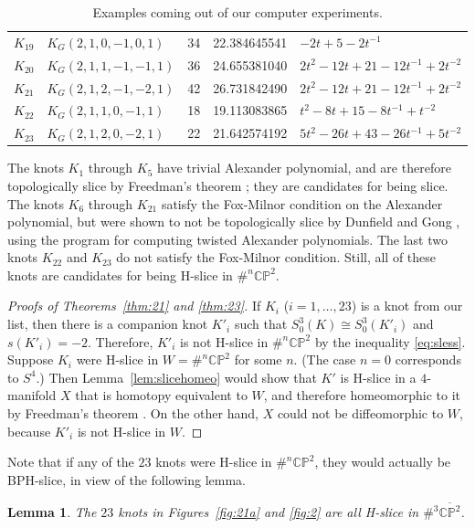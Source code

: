 \documentclass [11pt]{amsart}
\newtheorem {lemma}[theorem]{Lemma}
\theoremstyle{remark}
\def\CP{\mathbb{CP}^2}
\def\bCP{\overline{\mathbb{CP}^2}}
\begin{document}
\begin{table}
\begin{center}
\begin{tabular}{|c| l |  c | c | l |}
   $K_{19}$ & $K_G(2, 1, 0, -1, 0, 1)$ & 34 & 22.384645541 & $-2t+5 - 2t^{-1}$\\ 
   $K_{20}$ & $K_G(2, 1, 1, -1, -1, 1)$ & 36 & 24.655381040 & $2t^2-12t+21-12t^{-1}+2t^{-2}$ \\
   $K_{21}$ & $K_G(2, 1, 2, -1, -2, 1)$ & 42 & 26.731842490 & $2t^2-12t+21-12t^{-1}+2t^{-2}$ \\
   $K_{22}$ & $K_G(2, 1, 1, 0, -1, 1)$ & 18 & 19.113083865 & $t^2 -8t+15 - 8t^{-1} + t^{-2}$\\
   $K_{23}$ & $K_G(2, 1, 2, 0, -2, 1)$ & 22 & 21.642574192 & $5t^2 - 26t + 43 - 26t^{-1} + 5t^{-2}$\\   \hline
    \end{tabular}
  \end{center}
  \caption{Examples coming out of our computer experiments.} 
     \label{tab:table1}
\end{table}

The knots $K_1$ through $K_5$ have trivial Alexander polynomial, and are therefore topologically slice by Freedman's theorem \cite{Freedman}; they are candidates for being slice. The knots $K_6$ through $K_{21}$ satisfy the Fox-Milnor condition on the Alexander polynomial, but were shown to not be topologically slice by Dunfield and Gong \cite{DG}, using the program \cite{DG2} for computing twisted Alexander polynomials. The last two knots $K_{22}$ and $K_{23}$ do not satisfy the Fox-Milnor condition. Still, all of these knots are candidates for being H-slice in $\#^n \CP$.


\begin{proof}[Proofs of Theorems~\ref{thm:21} and \ref{thm:23}] If $K_i$ ($i=1,\dots, 23$) is a knot from our list, then there is a companion knot $K'_i$ such that $S^3_0(K) \cong S^3_0(K'_i)$ and $s(K'_i)=-2$. Therefore, $K'_i$ is not H-slice in $\#^n \CP$ by the inequality \eqref{eq:sless}. Suppose $K_i$ were H-slice in $W=\#^n \CP$ for some $n$. (The case $n=0$ corresponds to $S^4$.)  Then Lemma~\ref{lem:slicehomeo} would show that $K'$ is H-slice in a $4$-manifold $X$ that is homotopy equivalent to $W$, and therefore homeomorphic to it by Freedman's theorem \cite{Freedman}. On the other hand, $X$ could not be diffeomorphic to $W$, because $K'_i$ is not H-slice in $W$.
\end{proof}

Note that if any of the $23$ knots were H-slice in $\#^n \CP$, they would actually be BPH-slice, in view of the following lemma.
\begin{lemma}
The $23$ knots in Figures~\ref{fig:21a} and \ref{fig:2} are all H-slice in $\#^3 \bCP$. 
\end{lemma}
\end{document}
